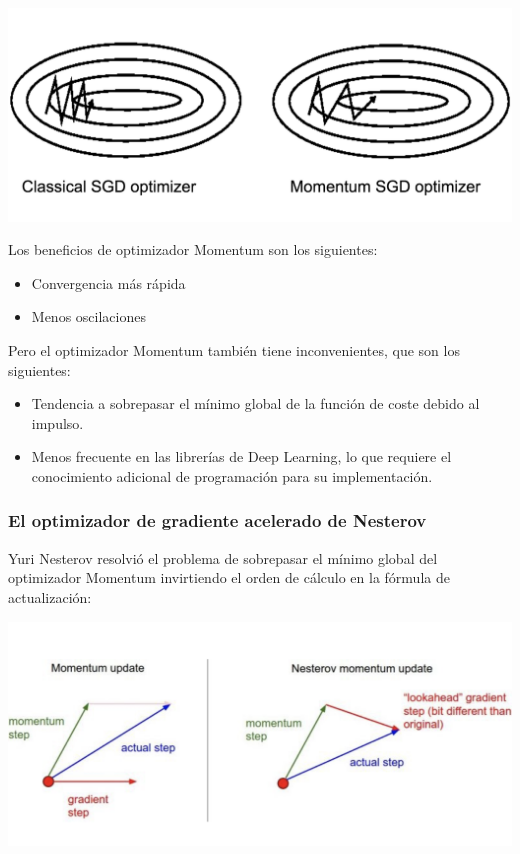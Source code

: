 \documentclass[]{book}
\providecommand{\tightlist}{%
  \setlength{\itemsep}{0pt}\setlength{\parskip}{0pt}}
\begin{document}
\includegraphics{Images/ANN_32.png}

Los beneficios de optimizador Momentum son los siguientes:

\begin{itemize}
\tightlist
\item
  Convergencia más rápida
\item
  Menos oscilaciones
\end{itemize}

Pero el optimizador Momentum también tiene inconvenientes, que son los siguientes:

\begin{itemize}
\tightlist
\item
  Tendencia a sobrepasar el mínimo global de la función de coste debido al impulso.
\item
  Menos frecuente en las librerías de Deep Learning, lo que requiere el conocimiento adicional de programación para su implementación.
\end{itemize}

\hypertarget{el-optimizador-de-gradiente-acelerado-de-nesterov}{%
\subsubsection{El optimizador de gradiente acelerado de Nesterov}\label{el-optimizador-de-gradiente-acelerado-de-nesterov}}

Yuri Nesterov resolvió el problema de sobrepasar el mínimo global del optimizador Momentum invirtiendo el orden de cálculo en la fórmula de actualización:

\includegraphics{Images/ANN_33.png}
\end{document}
